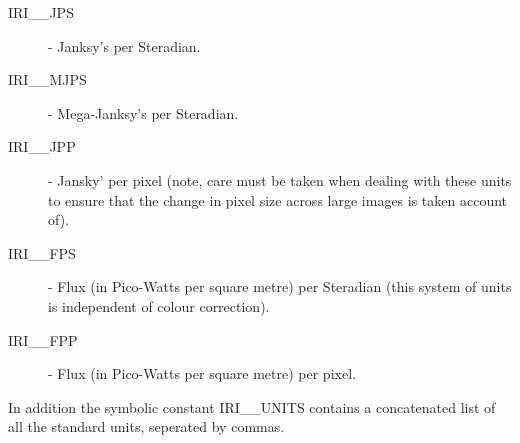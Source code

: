 \begin{description}
\item [IRI\_\_JPS] - Janksy's per Steradian.
\item [IRI\_\_MJPS] - Mega-Janksy's per Steradian.
\item [IRI\_\_JPP] - Jansky' per pixel (note, care must be taken when dealing
with these units to ensure that the change in pixel size across large images is
taken account of). 
\item [IRI\_\_FPS] - Flux (in Pico-Watts per square metre) per Steradian (this
system of units is independent of colour correction). 
\item [IRI\_\_FPP] - Flux (in Pico-Watts per square metre) per pixel.
\end{description}

In addition the symbolic constant IRI\_\_UNITS contains a concatenated list of 
all the standard units, seperated by commas.

